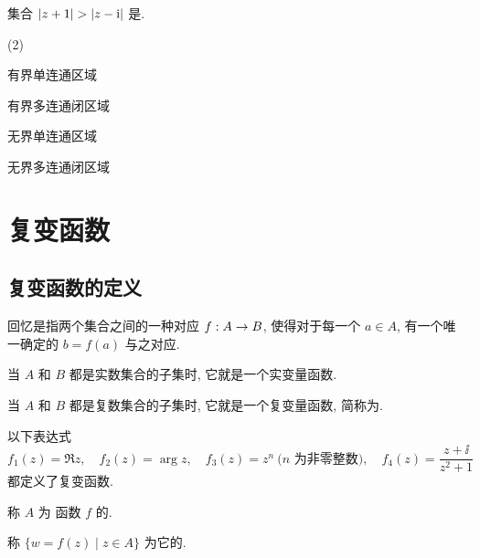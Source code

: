 \begin{exercise}
  集合 $\lvert z+1\rvert>\lvert z-\mathrm{i}\rvert$ 是\fillbrace{}.
  \begin{examplechoice}(2)
    \item 有界单连通区域
    \item 有界多连通闭区域
    \item 无界单连通区域
    \item 无界多连通闭区域
  \end{examplechoice}
\end{exercise}



\section{复变函数}

\subsection{复变函数的定义}

回忆是指两个集合之间的一种对应 $f:A\rightarrow B$, 使得对于每一个 $a\in A$, 有一个唯一确定的 $b=f(a)$ 与之对应.
\begin{enuma}
  \item 当 $A$ 和 $B$ 都是实数集合的子集时, 它就是一个实变量函数.
  \item 当 $A$ 和 $B$ 都是复数集合的子集时, 它就是一个复变量函数, 简称为.
\end{enuma}

\begin{example}
  以下表达式
  \[
    f_1(z)=\Re z,\quad
    f_2(z)=\arg z,\quad
    f_3(z)=z^n \ \text{($n$ 为非零整数)},\quad
    f_4(z)=\frac{z+\ii}{z^2+1}
  \]
  都定义了复变函数.
\end{example}

\begin{definition}
  \begin{enuma}
    \item 称 $A$ 为 函数 $f$ 的.
    \item 称 $\{w=f(z)\mid z\in A\}$ 为它的.\footnotemark
  \end{enuma} 
\end{definition}


